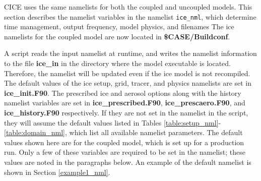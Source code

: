 
CICE uses the same namelists for both the coupled and uncoupled models.
This section describes the namelist variables in the namelist {\tt ice\_nml},
which determine time management, output frequency, model physics, and filenames
The ice namelists for the coupled model are now located in
{\bf \$CASE/Buildconf}.  

A script reads the input namelist at runtime, and writes the namelist
information to the file {\bf ice\_in} in the directory where the model 
executable is located.  Therefore, the namelist will be updated even if the 
ice model is not recompiled.  The default values of the ice setup, grid, 
tracer, and physics namelists are set in {\bf ice\_init.F90}.  The prescribed
ice and aerosol options along with the history namelist variables are set
in {\bf ice\_prescribed.F90}, {\bf ice\_prescaero.F90}, and 
{\bf ice\_history.F90} respectively. If they are not set in the namelist 
in the script, they will assume the default values listed in 
Tables \ref{table:setup_nml}-\ref{table:domain_nml}, which list all available 
namelist parameters.  The default values shown here are
for the coupled model, which is set up for a production run. Only a few of 
these variables are required to be set in the namelist; these values are 
noted in the paragraphs below.  An example of the default namelist is shown in 
Section \ref{example1_nml}.

